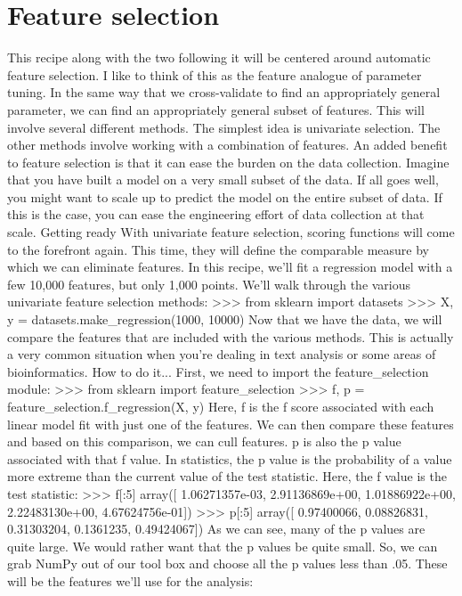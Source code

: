 \section*{Feature selection}
This recipe along with the two following it will be centered around automatic feature selection.
I like to think of this as the feature analogue of parameter tuning. In the same way that we
cross-validate to find an appropriately general parameter, we can find an appropriately general
subset of features. This will involve several different methods.
The simplest idea is univariate selection. The other methods involve working with a combination
of features.
An added benefit to feature selection is that it can ease the burden on the data collection.
Imagine that you have built a model on a very small subset of the data. If all goes well, you
might want to scale up to predict the model on the entire subset of data. If this is the case,
you can ease the engineering effort of data collection at that scale.
Getting ready
With univariate feature selection, scoring functions will come to the forefront again. This time,
they will define the comparable measure by which we can eliminate features.
In this recipe, we'll fit a regression model with a few 10,000 features, but only 1,000 points.
We'll walk through the various univariate feature selection methods:
>>> from sklearn import datasets
>>> X, y = datasets.make_regression(1000, 10000)
Now that we have the data, we will compare the features that are included with the various
methods. This is actually a very common situation when you're dealing in text analysis or
some areas of bioinformatics.
How to do it...
First, we need to import the feature_selection module:
>>> from sklearn import feature_selection
>>> f, p = feature_selection.f_regression(X, y)
Here, f is the f score associated with each linear model fit with just one of the features.
We can then compare these features and based on this comparison, we can cull features.
p is also the p value associated with that f value.
In statistics, the p value is the probability of a value more extreme than the current value of
the test statistic. Here, the f value is the test statistic:
>>> f[:5]
array([ 1.06271357e-03, 2.91136869e+00, 1.01886922e+00,
2.22483130e+00, 4.67624756e-01])
>>> p[:5]
array([ 0.97400066, 0.08826831, 0.31303204, 0.1361235, 0.49424067])
As we can see, many of the p values are quite large. We would rather want that the p values
be quite small. So, we can grab NumPy out of our tool box and choose all the p values less
than .05. These will be the features we'll use for the analysis:
